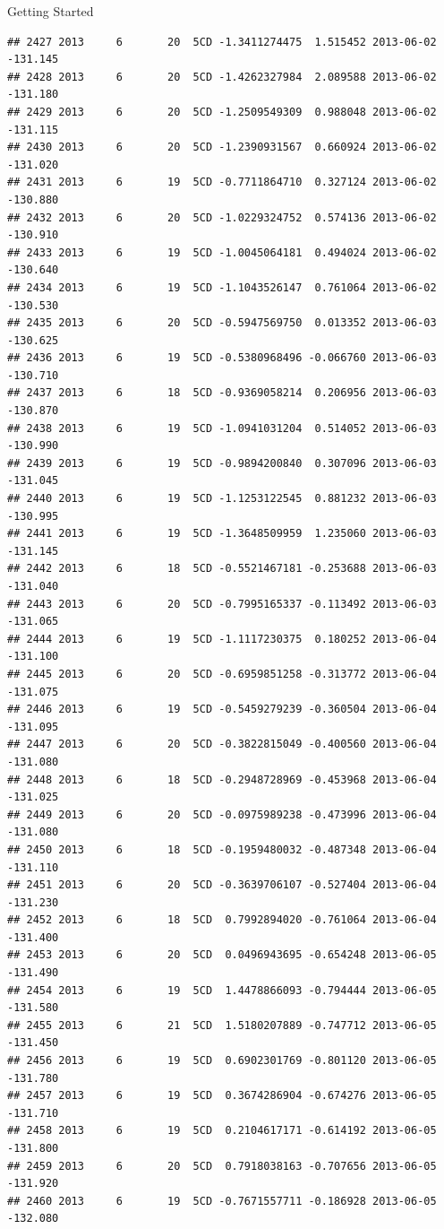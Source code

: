 \documentclass[
  ignorenonframetext,
]{beamer}
\begin{document}
\begin{frame}[fragile]{Getting Started}
\begin{verbatim}
## 2427 2013     6       20  5CD -1.3411274475  1.515452 2013-06-02 -131.145
## 2428 2013     6       20  5CD -1.4262327984  2.089588 2013-06-02 -131.180
## 2429 2013     6       20  5CD -1.2509549309  0.988048 2013-06-02 -131.115
## 2430 2013     6       20  5CD -1.2390931567  0.660924 2013-06-02 -131.020
## 2431 2013     6       19  5CD -0.7711864710  0.327124 2013-06-02 -130.880
## 2432 2013     6       20  5CD -1.0229324752  0.574136 2013-06-02 -130.910
## 2433 2013     6       19  5CD -1.0045064181  0.494024 2013-06-02 -130.640
## 2434 2013     6       19  5CD -1.1043526147  0.761064 2013-06-02 -130.530
## 2435 2013     6       20  5CD -0.5947569750  0.013352 2013-06-03 -130.625
## 2436 2013     6       19  5CD -0.5380968496 -0.066760 2013-06-03 -130.710
## 2437 2013     6       18  5CD -0.9369058214  0.206956 2013-06-03 -130.870
## 2438 2013     6       19  5CD -1.0941031204  0.514052 2013-06-03 -130.990
## 2439 2013     6       19  5CD -0.9894200840  0.307096 2013-06-03 -131.045
## 2440 2013     6       19  5CD -1.1253122545  0.881232 2013-06-03 -130.995
## 2441 2013     6       19  5CD -1.3648509959  1.235060 2013-06-03 -131.145
## 2442 2013     6       18  5CD -0.5521467181 -0.253688 2013-06-03 -131.040
## 2443 2013     6       20  5CD -0.7995165337 -0.113492 2013-06-03 -131.065
## 2444 2013     6       19  5CD -1.1117230375  0.180252 2013-06-04 -131.100
## 2445 2013     6       20  5CD -0.6959851258 -0.313772 2013-06-04 -131.075
## 2446 2013     6       19  5CD -0.5459279239 -0.360504 2013-06-04 -131.095
## 2447 2013     6       20  5CD -0.3822815049 -0.400560 2013-06-04 -131.080
## 2448 2013     6       18  5CD -0.2948728969 -0.453968 2013-06-04 -131.025
## 2449 2013     6       20  5CD -0.0975989238 -0.473996 2013-06-04 -131.080
## 2450 2013     6       18  5CD -0.1959480032 -0.487348 2013-06-04 -131.110
## 2451 2013     6       20  5CD -0.3639706107 -0.527404 2013-06-04 -131.230
## 2452 2013     6       18  5CD  0.7992894020 -0.761064 2013-06-04 -131.400
## 2453 2013     6       20  5CD  0.0496943695 -0.654248 2013-06-05 -131.490
## 2454 2013     6       19  5CD  1.4478866093 -0.794444 2013-06-05 -131.580
## 2455 2013     6       21  5CD  1.5180207889 -0.747712 2013-06-05 -131.450
## 2456 2013     6       19  5CD  0.6902301769 -0.801120 2013-06-05 -131.780
## 2457 2013     6       19  5CD  0.3674286904 -0.674276 2013-06-05 -131.710
## 2458 2013     6       19  5CD  0.2104617171 -0.614192 2013-06-05 -131.800
## 2459 2013     6       20  5CD  0.7918038163 -0.707656 2013-06-05 -131.920
## 2460 2013     6       19  5CD -0.7671557711 -0.186928 2013-06-05 -132.080

\end{verbatim}
\end{frame}
\end{document}
